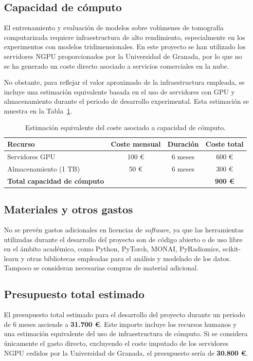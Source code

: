 \subsection{Capacidad de cómputo}

El entrenamiento y evaluación de modelos sobre volúmenes de tomografía computarizada requiere infraestructura de alto rendimiento, especialmente en los experimentos con modelos tridimensionales. En este proyecto se han utilizado los servidores NGPU proporcionados por la Universidad de Granada, por lo que no se ha generado un coste directo asociado a servicios comerciales en la nube.

No obstante, para reflejar el valor aproximado de la infraestructura empleada, se incluye una estimación equivalente basada en el uso de servidores con GPU y almacenamiento durante el periodo de desarrollo experimental. Esta estimación se muestra en la Tabla~\ref{tab:computo}.

\begin{table}[!htbp]
    \centering
    \begin{tabularx}{\textwidth}{|X|c|c|c|}
        \hline
        \textbf{Recurso} & \textbf{Coste mensual} & \textbf{Duración} & \textbf{Coste total} \\ \hline
        Servidores GPU & 100 € & 6 meses & 600 € \\
        Almacenamiento (1 TB) & 50 € & 6 meses & 300 € \\ \hline
        \textbf{Total capacidad de cómputo} & & & \textbf{900 €} \\ \hline
    \end{tabularx}
    \caption{Estimación equivalente del coste asociado a capacidad de cómputo.}
    \label{tab:computo}
\end{table}

\subsection{Materiales y otros gastos}

No se prevén gastos adicionales en licencias de \textit{software}, ya que las herramientas utilizadas durante el desarrollo del proyecto son de código abierto o de uso libre en el ámbito académico, como Python, PyTorch, MONAI, PyRadiomics, scikit-learn y otras bibliotecas empleadas para el análisis y modelado de los datos. Tampoco se consideran necesarias compras de material adicional.

\subsection{Presupuesto total estimado}

El presupuesto total estimado para el desarrollo del proyecto durante un periodo de 6 meses asciende a \textbf{31.700 €}. Este importe incluye los recursos humanos y una estimación equivalente del uso de infraestructura de cómputo. Si se considera únicamente el gasto directo, excluyendo el coste imputado de los servidores NGPU cedidos por la Universidad de Granada, el presupuesto sería de \textbf{30.800 €}.
